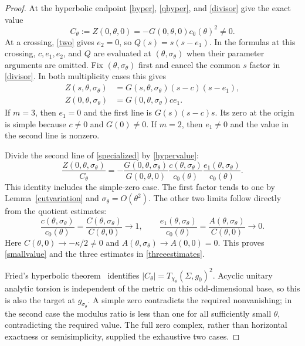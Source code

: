 \documentclass[11pt,letterpaper,reqno]{amsart}
\theoremstyle{remark}
\begin{document}
\begin{proof}
At the hyperbolic endpoint \eqref{hyper}, \eqref{qhyper}, and
\eqref{divisor} give the exact value
\begin{equation}\label{hypervalue}
 C_\theta:=Z(0,\theta,0)
       =-G(0,\theta,0)c_0(\theta)^2\neq0.
\end{equation}
At a crossing, \eqref{two} gives $e_2=0$, so $Q(s)=s(s-e_1)$.
In the formulas at this crossing, $c,e_1,e_2$, and $Q$ are evaluated
at $(\theta,\sigma_\theta)$ when their parameter arguments are omitted.
Fix $(\theta,\sigma_\theta)$ first and cancel the common $s$ factor
in \eqref{divisor}. In both multiplicity cases this gives
\begin{equation}\label{specialized}
 \begin{aligned}
 Z(s,\theta,\sigma_\theta)
   &=G(s,\theta,\sigma_\theta)(s-c)(s-e_1),\\
 Z(0,\theta,\sigma_\theta)
   &=G(0,\theta,\sigma_\theta)c e_1.
 \end{aligned}
\end{equation}
If $m=3$, then $e_1=0$ and the first line is $G(s)(s-c)s$. Its
zero at the origin is simple because $c\ne0$ and $G(0)\ne0$.
If $m=2$, then $e_1\ne0$ and the value in the second line is nonzero.

Divide the second line of \eqref{specialized} by \eqref{hypervalue}:
\begin{equation}\label{exactratio}
 \frac{Z(0,\theta,\sigma_\theta)}{C_\theta}
 =-\frac{G(0,\theta,\sigma_\theta)}{G(0,\theta,0)}
   \frac{c(\theta,\sigma_\theta)}{c_0(\theta)}
   \frac{e_1(\theta,\sigma_\theta)}{c_0(\theta)}.
\end{equation}
This identity includes the simple-zero case. The first factor tends
to one by Lemma~\ref{cutvariation} and $\sigma_\theta=O(\theta^2)$.
The other two limits follow directly from the quotient estimates:
\begin{equation}\label{coefficientratios}
 \frac{c(\theta,\sigma_\theta)}{c_0(\theta)}
   =\frac{C(\theta,\sigma_\theta)}{C(\theta,0)}\longrightarrow1,
 \qquad
 \frac{e_1(\theta,\sigma_\theta)}{c_0(\theta)}
   =\frac{A(\theta,\sigma_\theta)}{C(\theta,0)}\longrightarrow0.
\end{equation}
Here $C(\theta,0)\to-\kappa/2\ne0$ and
$A(\theta,\sigma_\theta)\to A(0,0)=0$. This proves
\eqref{smallvalue} and the three estimates in \eqref{threeestimates}.

Fried's hyperbolic theorem~\cite{Fried} identifies
$|C_\theta|=T_{\chi_\theta}(\Sigma,g_0)^2$. Acyclic unitary analytic
torsion is independent of the metric on this odd-dimensional base,
so this is also the target at $g_{\sigma_\theta}$. A simple zero
contradicts the required nonvanishing; in the second case the modulus
ratio is less than one for all sufficiently small $\theta$, contradicting
the required value. The full zero complex, rather than horizontal
exactness or semisimplicity, supplied the exhaustive two cases.
\end{proof}
\end{document}
